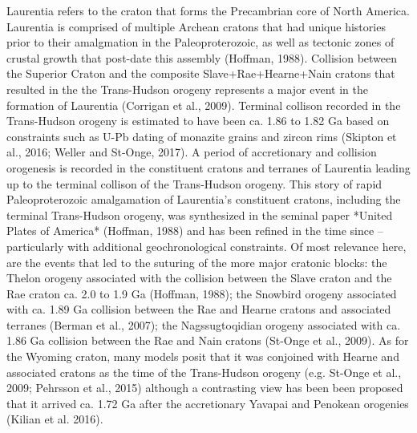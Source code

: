 \documentclass[11pt,letterpaper]{article}
\begin{document}
Laurentia refers to the craton that forms the Precambrian core of North America. Laurentia is comprised of multiple Archean cratons that had unique histories prior to their amalgmation in the Paleoproterozoic, as well as tectonic zones of crustal growth that post-date this assembly (Hoffman, 1988). Collision between the Superior Craton and the composite Slave+Rae+Hearne+Nain cratons that resulted in the the Trans-Hudson orogeny represents a major event in the formation of Laurentia (Corrigan et al., 2009). Terminal collison recorded in the Trans-Hudson orogeny is estimated to have been ca. 1.86 to 1.82 Ga based on constraints such as U-Pb dating of monazite grains and zircon rims (Skipton et al., 2016; Weller and St-Onge, 2017). A period of accretionary and collision orogenesis is recorded in the constituent cratons and terranes of Laurentia leading up to the terminal collison of the Trans-Hudson orogeny. This story of rapid Paleoproterozoic amalgamation of  Laurentia's constituent cratons, including the terminal Trans-Hudson orogeny, was synthesized in the seminal paper *United Plates of America* (Hoffman, 1988) and has been refined in the time since -- particularly with additional geochronological constraints. Of most relevance here, are the events that led to the suturing of the more major cratonic blocks: the Thelon orogeny associated with the collision between the Slave craton and the Rae craton ca. 2.0 to 1.9 Ga (Hoffman, 1988); the Snowbird orogeny associated with ca. 1.89 Ga collision between the Rae and Hearne cratons and associated terranes (Berman et al., 2007); the Nagssugtoqidian orogeny associated with ca. 1.86 Ga collision between the Rae and Nain cratons (St-Onge et al., 2009). As for the Wyoming craton, many models posit that it was conjoined with Hearne and associated cratons as the time of the Trans-Hudson orogeny (e.g. St-Onge et al., 2009; Pehrsson et al., 2015) although a contrasting view has been been proposed that it arrived ca. 1.72 Ga after the accretionary Yavapai and Penokean orogenies (Kilian et al. 2016).  
\end{document}
